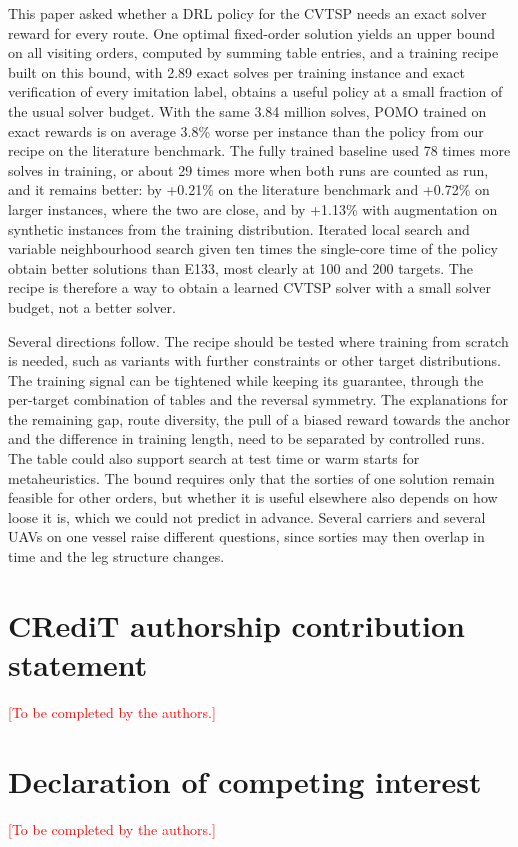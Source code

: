\documentclass[preprint,12pt,authoryear]{elsarticle}
\newcommand{\placeholder}[1]{\textcolor{red}{[#1]}}
\begin{document}
This paper asked whether a DRL policy for the CVTSP needs an exact solver reward for every route. One optimal fixed-order solution yields an upper bound on all visiting orders, computed by summing table entries, and a training recipe built on this bound, with 2.89 exact solves per training instance and exact verification of every imitation label, obtains a useful policy at a small fraction of the usual solver budget. With the same 3.84 million solves, POMO trained on exact rewards is on average 3.8\% worse per instance than the policy from our recipe on the literature benchmark. The fully trained baseline used 78 times more solves in training, or about 29 times more when both runs are counted as run, and it remains better: by +0.21\% on the literature benchmark and +0.72\% on larger instances, where the two are close, and by +1.13\% with augmentation on synthetic instances from the training distribution. Iterated local search and variable neighbourhood search given ten times the single-core time of the policy obtain better solutions than E133, most clearly at 100 and 200 targets. The recipe is therefore a way to obtain a learned CVTSP solver with a small solver budget, not a better solver.

Several directions follow. The recipe should be tested where training from scratch is needed, such as variants with further constraints or other target distributions. The training signal can be tightened while keeping its guarantee, through the per-target combination of tables and the reversal symmetry. The explanations for the remaining gap, route diversity, the pull of a biased reward towards the anchor and the difference in training length, need to be separated by controlled runs. The table could also support search at test time or warm starts for metaheuristics. The bound requires only that the sorties of one solution remain feasible for other orders, but whether it is useful elsewhere also depends on how loose it is, which we could not predict in advance. Several carriers \citep{fahradyan2020} and several UAVs on one vessel \citep{ren2026} raise different questions, since sorties may then overlap in time and the leg structure changes.

\section*{CRediT authorship contribution statement}
\placeholder{To be completed by the authors.}

\section*{Declaration of competing interest}
\placeholder{To be completed by the authors.}
\end{document}
